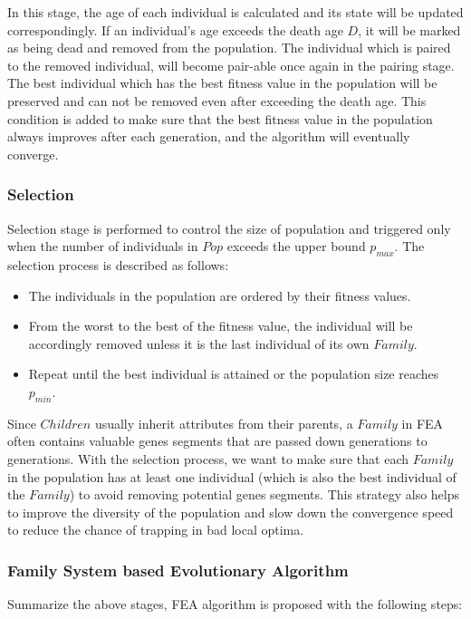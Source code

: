 \documentclass[final]{elsarticle}
\begin{document}
In this stage, the age of each individual is calculated and its state will be updated correspondingly. If an individual's age exceeds the death age $D$, it will be marked as being dead and removed from the population. The individual which is paired to the removed individual, will become pair-able once again in the pairing stage. The best individual which has the best fitness value in the population will be preserved and can not be removed even after exceeding the death age. This condition is added to make sure that the best fitness value in the population always improves after each generation, and the algorithm will eventually converge.

\subsubsection{Selection}

Selection stage is performed to control the size of population and triggered only when the number of individuals in $Pop$ exceeds the upper bound $p_{max}$. The selection process is described as follows: 
\begin{itemize}
	\item The individuals in the population are ordered by their fitness values. 
	\item From the worst to the best of the fitness value, the individual will be accordingly removed unless it is the last individual of its own $ Family $. 
	\item Repeat until the best individual is attained or the population size reaches $p_{min}$.
\end{itemize}
Since $Children$ usually inherit attributes from their parents, a $Family$ in FEA often contains valuable genes segments that are passed down generations to generations. With the selection process, we want to make sure that each $ Family $ in the population has at least one individual (which is also the best individual of the $ Family $) to avoid removing potential genes segments. This strategy also helps to improve the diversity of the population and slow down the convergence speed to reduce the chance of trapping in bad local optima.

\subsubsection{Family System based Evolutionary Algorithm}

Summarize the above stages, FEA algorithm is proposed with the following steps:
\end{document}

